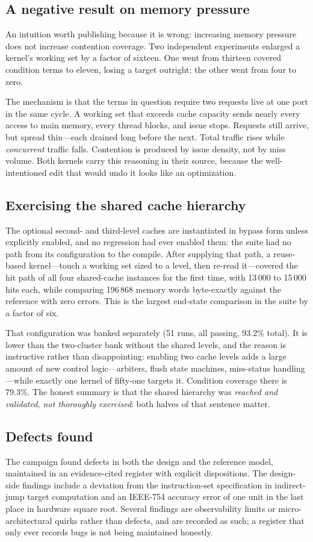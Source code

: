 \documentclass[conference]{IEEEtran}
\begin{document}
\subsection{A negative result on memory pressure}
An intuition worth publishing because it is wrong: increasing memory
pressure does not increase contention coverage. Two independent
experiments enlarged a kernel's working set by a factor of sixteen. One
went from thirteen covered condition terms to eleven, losing a target
outright; the other went from four to zero.

The mechanism is that the terms in question require two requests live at
one port in the same cycle. A working set that exceeds cache capacity
sends nearly every access to main memory, every thread blocks, and
issue stops. Requests still arrive, but spread thin---each drained long
before the next. Total traffic rises while \emph{concurrent} traffic
falls. Contention is produced by issue density, not by miss volume. Both
kernels carry this reasoning in their source, because the
well-intentioned edit that would undo it looks like an optimization.

\subsection{Exercising the shared cache hierarchy}
The optional second- and third-level caches are instantiated in bypass
form unless explicitly enabled, and no regression had ever enabled them:
the suite had no path from its configuration to the compile. After
supplying that path, a reuse-based kernel---touch a working set sized to a
level, then re-read it---covered the hit path of all four shared-cache
instances for the first time, with 13\,000 to 15\,000 hits each, while
comparing 196\,868 memory words byte-exactly against the reference with
zero errors. This is the largest end-state comparison in the suite by a
factor of six.

That configuration was banked separately (51 runs, all passing, 93.2\% total).
It is lower than the two-cluster bank without the shared levels, and the reason
is instructive rather than disappointing: enabling two cache levels adds a large
amount of new control logic---arbiters, flush state machines, miss-status
handling---while exactly one kernel of fifty-one targets it. Condition coverage
there is 79.3\%. The honest summary is that the shared hierarchy was
\emph{reached and validated, not thoroughly exercised}: both halves of that
sentence matter.

\subsection{Defects found}
The campaign found defects in both the design and the reference model,
maintained in an evidence-cited register with explicit dispositions. The
design-side findings include a deviation from the instruction-set
specification in indirect-jump target computation and an IEEE-754 accuracy
error of one unit in the last place in hardware square root. Several
findings are observability limits or micro-architectural quirks rather
than defects, and are recorded as such; a register that only ever records
bugs is not being maintained honestly.
\end{document}
